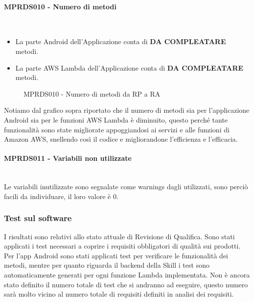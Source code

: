 \paragraph{MPRDS010 - Numero di metodi}\mbox{}\\[0.4cm]
\begin{itemize}
	\item La parte Android dell'Applicazione conta di \textbf{DA COMPLEATARE} metodi.
	\item La parte AWS Lambda dell'Applicazione conta di \textbf{DA COMPLEATARE} metodi.
\end{itemize}
\begin{figure}[H]
	\centering
	\caption{\label{fig:mission}MPRDS010 -  Numero di metodi da RP a RA}
\end{figure}
Notiamo dal grafico sopra riportato che il numero di metodi sia per l'applicazione Android sia per le funzioni AWS Lambda è diminuito, questo perché tante funzionalità sono state migliorate appoggiandosi ai servizi e alle funzioni di Amazon AWS, snellendo così il codice e migliorandone l'efficienza e l'efficacia.
\paragraph{MPRDS011 - Variabili non utilizzate}\mbox{}\\[0.4cm]
Le variabili inutilizzate sono segnalate come warnings dagli  utilizzati, sono perciò facili da individuare, il loro valore è 0.
\subsubsection{Test sul software}
I risultati sono relativi allo stato attuale di Revisione di Qualifica. Sono stati applicati i test necessari a coprire i requisiti obbligatori di qualità sui prodotti. Per l'app Android sono stati applicati test per verificare le funzionalità dei metodi, mentre per quanto riguarda il backend della Skill i test sono automaticamente generati per ogni funzione Lambda implementata. Non è ancora stato definito il numero totale di test che si andranno ad eseguire, questo numero sarà molto vicino al numero totale di requisiti definiti in analisi dei requisiti.
